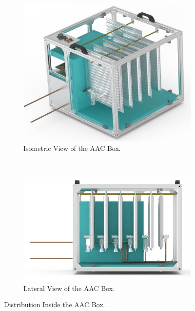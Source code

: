 \begin{figure}[H]
    \centering
    \begin{subfigure}[b]{0.47\textwidth}
        \includegraphics[width=\textwidth]{4-experiment-design/img/Mechanical/Figure_22a.png}
         \caption{Isometric View of the AAC Box.}
    \label{iso_aac}
    \end{subfigure}
    ~
    \begin{subfigure}[b]{0.47\textwidth}
        \centering
         \includegraphics[width=\textwidth]{4-experiment-design/img/Mechanical/Figure_22b.png}
        \caption{Lateral View of the AAC Box.}
        \label{lateral_aac}
        \end{subfigure}
    \caption{Distribution Inside the AAC Box.}
    \label{fig:Distribution-AAC}
\end{figure}


